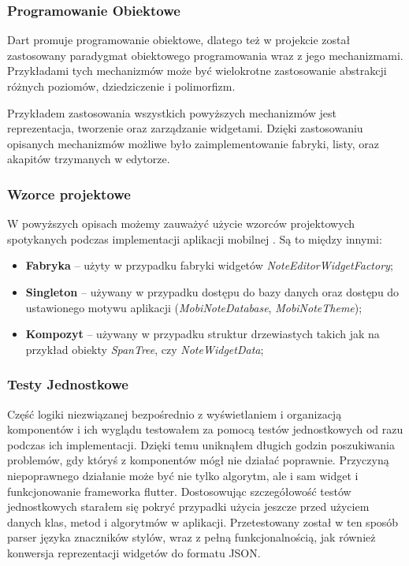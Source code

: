\subsubsection{Programowanie Obiektowe}

Dart promuje programowanie obiektowe, dlatego też w projekcie został zastosowany paradygmat obiektowego programowania wraz z jego mechanizmami. Przykładami tych mechanizmów może być wielokrotne zastosowanie abstrakcji różnych poziomów, dziedziczenie i polimorfizm.

Przykładem zastosowania wszystkich powyższych mechanizmów jest reprezentacja, tworzenie oraz zarządzanie widgetami. 
Dzięki zastosowaniu opisanych mechanizmów możliwe było zaimplementowanie fabryki, listy, oraz akapitów trzymanych w edytorze.

\subsubsection{Wzorce projektowe}

W powyższych opisach możemy zauważyć użycie wzorców projektowych spotykanych podczas implementacji aplikacji mobilnej \cite{flutterdesignpatterns}. Są to między innymi:

\begin{itemize}
    \item \textbf{Fabryka} -- użyty w przypadku fabryki widgetów \textit{NoteEditorWidgetFactory};
    \item \textbf{Singleton} -- używany w przypadku dostępu do bazy danych oraz dostępu do ustawionego motywu aplikacji (\textit{MobiNoteDatabase}, \textit{MobiNoteTheme});
    \item \textbf{Kompozyt} -- używany w przypadku struktur drzewiastych takich jak na przykład obiekty \textit{SpanTree}, czy \textit{NoteWidgetData};
\end{itemize}

\subsubsection{Testy Jednostkowe}

Część logiki niezwiązanej bezpośrednio z wyświetlaniem i organizacją komponentów i ich wyglądu testowałem za pomocą testów jednostkowych od razu podczas ich implementacji. Dzięki temu uniknąłem długich godzin poszukiwania problemów, gdy któryś z komponentów mógł nie działać poprawnie. Przyczyną niepoprawnego działanie może być nie tylko algorytm, ale i sam widget i funkcjonowanie frameworka flutter. Dostosowując szczegółowość testów jednostkowych starałem się pokryć przypadki użycia jeszcze przed użyciem danych klas, metod i algorytmów w aplikacji. Przetestowany został w ten sposób parser języka znaczników stylów, wraz z pełną funkcjonalnością, jak również konwersja reprezentacji widgetów do formatu JSON.

